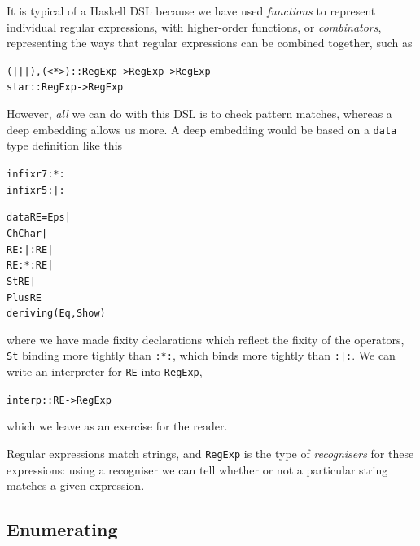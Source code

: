 It is typical of a Haskell DSL because we have used \emph{functions} to represent individual regular expressions, with higher-order functions, or \emph{combinators}, representing the ways that regular expressions can be combined together, such as
\begin{alltt}
(|||), (<*>) :: RegExp -> RegExp -> RegExp
star :: RegExp -> RegExp
\end{alltt}
However, \emph{all} we can do with this DSL is to check pattern matches, whereas a deep embedding allows us more. A deep embedding would be based on a \texttt{data} type definition like this
\begin{alltt}\minx{:*:}
infixr 7 :*:
infixr 5 :|:

data RE = Eps |
          Ch Char |
          RE :|: RE |
          RE :*: RE |
          St RE |
          Plus RE
          deriving(Eq,Show)
\end{alltt}
where we have made fixity declarations which reflect the fixity of the operators, \texttt{St} binding more tightly than \texttt{:*:}, which binds more tightly than \texttt{:|:}. We can write an interpreter for \texttt{RE} into \texttt{RegExp},
\begin{alltt}
interp :: RE -> RegExp
\end{alltt}
which we leave as an exercise for the reader.

Regular expressions match strings, and \texttt{RegExp} is the type of \emph{recognisers} for these expressions: using a recogniser we can tell whether or not a particular string  matches a given expression. 

\subsection*{Enumerating}

